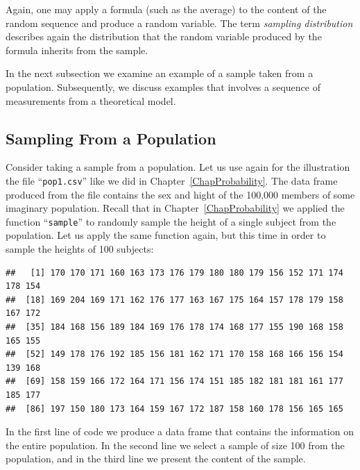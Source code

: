 \documentclass[]{krantz}
\makeatletter
\newenvironment{Shaded}{\begin{snugshade}}{\end{snugshade}}
\newcommand{\KeywordTok}[1]{\textcolor[rgb]{0.13,0.29,0.53}{\textbf{#1}}}
\newcommand{\DecValTok}[1]{\textcolor[rgb]{0.00,0.00,0.81}{#1}}
\newcommand{\StringTok}[1]{\textcolor[rgb]{0.31,0.60,0.02}{#1}}
\newcommand{\OperatorTok}[1]{\textcolor[rgb]{0.81,0.36,0.00}{\textbf{#1}}}
\newcommand{\NormalTok}[1]{#1}
\newenvironment{kframe}{%
\medskip{}
\setlength{\fboxsep}{.8em}
 \def\at@end@of@kframe{}%
 \ifinner\ifhmode%
  \def\at@end@of@kframe{\end{minipage}}%
  \begin{minipage}{\columnwidth}%
 \fi\fi%
 \def\FrameCommand##1{\hskip\@totalleftmargin \hskip-\fboxsep
 \colorbox{shadecolor}{##1}\hskip-\fboxsep
     \hskip-\linewidth \hskip-\@totalleftmargin \hskip\columnwidth}%
 \MakeFramed {\advance\hsize-\width
   \@totalleftmargin\z@ \linewidth\hsize
   \@setminipage}}%
 {\par\unskip\endMakeFramed%
 \at@end@of@kframe}
\renewenvironment{Shaded}{\begin{kframe}}{\end{kframe}}
\theoremstyle{definition}
\theoremstyle{definition}
\theoremstyle{definition}
\theoremstyle{remark}
\makeatother
\begin{document}
Again, one may apply a formula (such as the average) to the content of
the random sequence and produce a random variable. The term
\emph{sampling distribution} describes again the distribution that the
random variable produced by the formula inherits from the sample.

In the next subsection we examine an example of a sample taken from a
population. Subsequently, we discuss examples that involves a sequence
of measurements from a theoretical model.

\subsection{Sampling From a
Population}\label{sampling-from-a-population}

Consider taking a sample from a population. Let us use again for the
illustration the file ``\texttt{pop1.csv}'' like we did in
Chapter~\ref{ChapProbability}. The data frame produced from the file
contains the sex and hight of the 100,000 members of some imaginary
population. Recall that in Chapter~\ref{ChapProbability} we applied the
function ``\texttt{sample}'' to randomly sample the height of a single
subject from the population. Let us apply the same function again, but
this time in order to sample the heights of 100 subjects:

\begin{Shaded}
\end{Shaded}

\begin{verbatim}
##   [1] 170 170 171 160 163 173 176 179 180 180 179 156 152 171 174 178 154
##  [18] 169 204 169 171 162 176 177 163 167 175 164 157 178 179 158 167 172
##  [35] 184 168 156 189 184 169 176 178 174 168 177 155 190 168 158 165 155
##  [52] 149 178 176 192 185 156 181 162 171 170 158 168 166 156 154 139 168
##  [69] 158 159 166 172 164 171 156 174 151 185 182 181 181 161 177 185 177
##  [86] 197 150 180 173 164 159 167 172 187 158 160 178 156 165 165
\end{verbatim}

In the first line of code we produce a data frame that contains the
information on the entire population. In the second line we select a
sample of size 100 from the population, and in the third line we present
the content of the sample.
\end{document}
